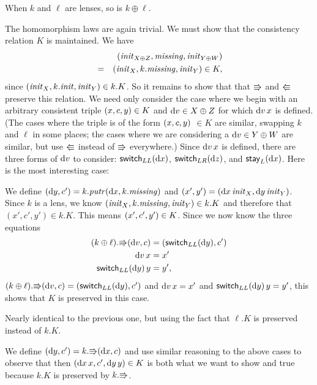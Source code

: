 \begin{theorem}
    When $k$ and $\ell$ are lenses, so is $k \oplus \ell$.
    \label{goodlens:tensor_sum}
\end{theorem}
\begin{pf}
The homomorphism laws are again trivial.  
We must show that the consistency relation $K$ is maintained. We have
\begin{eqnarray*}
&& (\mathit{init}_{X \oplus Z},\mathit{missing},\mathit{init}_{Y \oplus
W}) \\ & = & ({\mathit{init}_X},{k.\mathit{missing}},{\mathit{init}_Y}) \in K,
\end{eqnarray*}
since
$(\mathit{init}_X,k.\mathit{init},\mathit{init}_Y) \in k.K$.  So it remains to show that that
$\mathord{\Rrightarrow}$ and $\mathord{\Lleftarrow}$ preserve this relation. We need only consider 
the case where we begin with an arbitrary consistent triple
$( x, c, y) \in K$ and $\textrm{d} v \in X \oplus Z$ for which
$\textrm{d} v\, x$ is defined. (The cases where the triple is of the form
$( x, c, y)$ $ \in K$ are similar, swapping $k$ and
$\ell$ in some places; the cases where we are considering a $\textrm{d} v \in Y
\oplus W$ are similar, but use $\mathord{\Lleftarrow}$ instead of $\mathord{\Rrightarrow}$ everywhere.)
Since $\textrm{d} v\, x$ is defined, there are three forms of $\textrm{d} v$ to consider:
$\mathsf{switch}_{LL}(\textrm{d} x)$, $\mathsf{switch}_{LR}(\textrm{d} z)$, and $\mathsf{stay}_L(\textrm{d} x)$. \iffull\else Here is the
most interesting case:\fi
\begin{trivlist} 
\nextcase{$\dv=\mlswitchll\dx$} We define $(\textrm{d} y,c') =
    k.\mathit{putr}(\textrm{d} x,k.\mathit{missing})$ and $(x',y')=(\textrm{d} x\,\mathit{init}_X,\textrm{d} y\,\mathit{init}_Y)$.
    Since $k$ is a lens, we know $(\mathit{init}_X,k.\mathit{missing},\mathit{init}_Y) \in k.K$ and
    therefore that $(x',c',y') \in k.K$. This means
    $({x'},{c'},{y'}) \in K$. Since
    \iffull
    we now know the three equations
    \begin{align*}
        (k\oplus\ell).\mathord{\Rrightarrow}(\textrm{d} v, c) &= (\mathsf{switch}_{LL}(\textrm{d} y),{c'}) \\
        \textrm{d} v\, x &= {x'} \\
        \mathsf{switch}_{LL}(\textrm{d} y)\, y &= {y'},
    \end{align*}
    \else
    $(k\oplus\ell).\mathord{\Rrightarrow}(\textrm{d} v, c)=(\mathsf{switch}_{LL}(\textrm{d} y),{c'})$ and
    $\textrm{d} v\, x = {x'}$ and $\mathsf{switch}_{LL}(\textrm{d} y)\, y =
    {y'}$,
    \fi
    this shows that $K$ is preserved in this case.
\iffull

\nextcase{$\dv=\mlswitchlr\dz$} Nearly identical to the previous one, but
    using the fact that $\ell.K$ is preserved instead of $k.K$.

\nextcase{$\dv=\mlstayl\dx$} We define $(\textrm{d} y,c') = k.\mathord{\Rrightarrow}(\textrm{d} x,c)$ and use
    similar reasoning to the above cases to observe that then
    $({\textrm{d} x\,x},{c'},{\textrm{d} y\,y}) \in K$ is both what we want
    to show and true because $k.K$ is preserved by $k.\mathord{\Rrightarrow}$.
\fi%
    \endofpf
\end{trivlist}
\end{pf}

